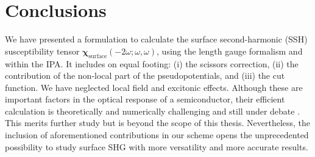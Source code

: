 \section{Conclusions}

We have presented a formulation to calculate the surface second-harmonic (SSH)
susceptibility tensor
$\boldsymbol{\chi}_{\mathrm{surface}}(-2\omega;\omega,\omega)$, using the length
gauge formalism and within the IPA. It includes on equal footing: (i) the
scissors correction, (ii) the contribution of the non-local part of the
pseudopotentials, and (iii) the cut function. We have neglected local field and
excitonic effects. Although these are important factors in the optical response
of a semiconductor, their efficient calculation is theoretically and numerically
challenging and still under debate \cite{beyond}. This merits further study but
is beyond the scope of this thesis. Nevertheless, the inclusion of
aforementioned contributions in our scheme opens the unprecedented possibility
to study surface SHG with more versatility and more accurate results.


\stopcontents[chapters]

